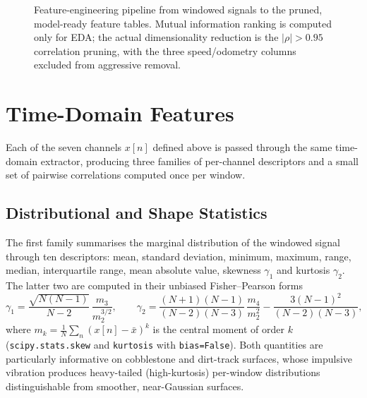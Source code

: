 \begin{figure}[H]
    \caption{Feature-engineering pipeline from windowed signals to the pruned, model-ready feature tables. Mutual information ranking is computed only for EDA; the actual dimensionality reduction is the $|\rho|>0.95$ correlation pruning, with the three speed/odometry columns excluded from aggressive removal.}
    \label{fig:feature_pipeline}
\end{figure}

\section{Time-Domain Features}
\label{sec:feat_time}

Each of the seven channels $x[n]$ defined above is passed through the same time-domain extractor, producing three families of per-channel descriptors and a small set of pairwise correlations computed once per window.

\subsection{Distributional and Shape Statistics}

The first family summarises the marginal distribution of the windowed signal through ten descriptors: mean, standard deviation, minimum, maximum, range, median, interquartile range, mean absolute value, skewness $\gamma_1$ and kurtosis $\gamma_2$. The latter two are computed in their unbiased Fisher--Pearson forms
\begin{equation}
    \gamma_1 = \frac{\sqrt{N(N-1)}}{N-2}\,\frac{m_3}{m_2^{3/2}},
    \qquad
    \gamma_2 = \frac{(N+1)(N-1)}{(N-2)(N-3)}\,\frac{m_4}{m_2^{2}} - \frac{3(N-1)^{2}}{(N-2)(N-3)},
    \label{eq:skew_kurt}
\end{equation}
where $m_k = \tfrac{1}{N}\sum_n (x[n]-\bar x)^{k}$ is the central moment of order $k$ (\texttt{scipy.stats.skew} and \texttt{kurtosis} with \texttt{bias=False}). Both quantities are particularly informative on cobblestone and dirt-track surfaces, whose impulsive vibration produces heavy-tailed (high-kurtosis) per-window distributions distinguishable from smoother, near-Gaussian surfaces.

